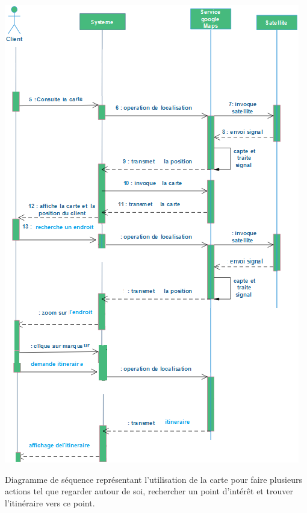 \documentclass[a4paper, 12pt, notitlepage]{article} %
\begin{document}
\begin{umlFig}[!htb]
   \centering
   \includegraphics[height=0.9\textheight]{UtiliseMap.png}
   \caption[Diagramme d'utilisation de la carte]{Diagramme de séquence représentant l'utilisation de la carte pour faire plusieurs actions tel que regarder autour de soi, rechercher un point d'intérêt et trouver l'itinéraire vers ce point.}
   \label{UML:UtiliseMap}
\end{umlFig}
\end{document}
